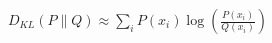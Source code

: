 \documentclass[preview]{standalone}
\begin{document}
\begin{align*}
D_{KL}(P \| Q) \approx \sum_{i} P(x_i) \log\left(\frac{P(x_i)}{Q(x_i)}\right)
\end{align*}
\end{document}
